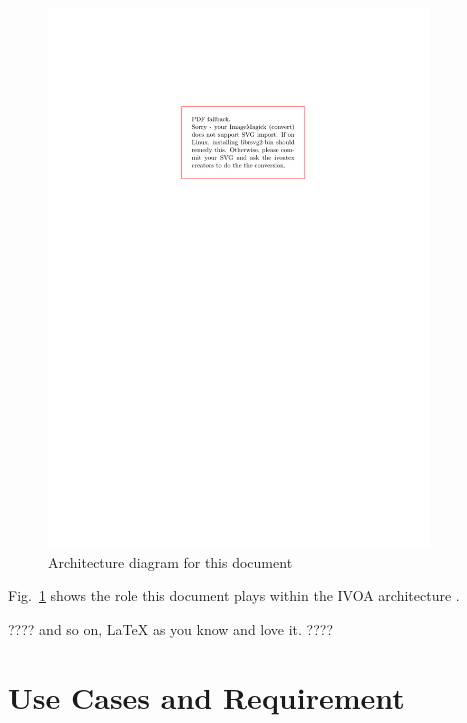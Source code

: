 \documentclass[11pt,a4paper]{ivoa}
\begin{document}
\begin{figure}
\centering


\includegraphics[width=0.9\textwidth]{role_diagram.pdf}
\caption{Architecture diagram for this document}
\label{fig:archdiag}
\end{figure}

Fig.~\ref{fig:archdiag} shows the role this document plays within the
IVOA architecture \citep{note:VOARCH}.

???? and so on, LaTeX as you know and love it. ????

\section{Use Cases and Requirement}
\end{document}
